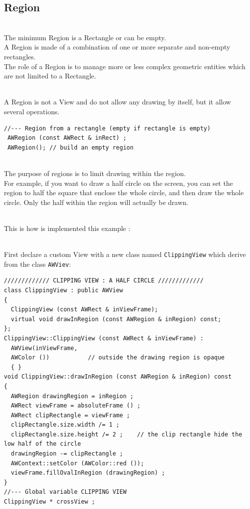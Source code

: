 \documentclass[a4paper,11pt]{extarticle}
\begin{document}
\newpage
\subsection{Region}

~\\ The minimum Region is a Rectangle or can be empty.
~\\ A Region is made of a combination of one or more separate and non-empty rectangles.
~\\ The role of a Region is to manage more or less complex geometric entities which are not limited to a Rectangle.

~\\ A Region is not a View and do not allow any drawing by itself, but it allow several operations.

\begin{lstlisting}[language=Arduinonl]
//--- Region from a rectangle (empty if rectangle is empty)
 AWRegion (const AWRect & inRect) ; 
 AWRegion(); // build an empty region
\end{lstlisting}
  
~\\ The purpose of regions is to limit drawing within the region. 
~\\ For example, if you want to draw a half circle on the screen, you can set the region to half the square that enclose the whole circle, and then draw the whole circle. Only the half within the region will actually be drawn.

~\\ This is how is implemented this example :

~\\ First declare a custom View with a new class named \texttt{ClippingView} which derive from the class \texttt{AWViev}:

\begin{lstlisting}[language=Arduinonl]
///////////// CLIPPING VIEW : A HALF CIRCLE /////////////
class ClippingView : public AWView
{
  ClippingView (const AWRect & inViewFrame);
  virtual void drawInRegion (const AWRegion & inRegion) const;
};
ClippingView::ClippingView (const AWRect & inViewFrame) :
  AWView(inViewFrame, 
  AWColor ())           // outside the drawing region is opaque 
  { }
void ClippingView::drawInRegion (const AWRegion & inRegion) const
{
  AWRegion drawingRegion = inRegion ;
  AWRect viewFrame = absoluteFrame () ;
  AWRect clipRectangle = viewFrame ;
  clipRectangle.size.width /= 1 ;
  clipRectangle.size.height /= 2 ;    // the clip rectangle hide the low half of the circle
  drawingRegion -= clipRectangle ;
  AWContext::setColor (AWColor::red ());
  viewFrame.fillOvalInRegion (drawingRegion) ;
}
//--- Global variable CLIPPING VIEW
ClippingView * crossView ;
\end{lstlisting}
\end{document}
